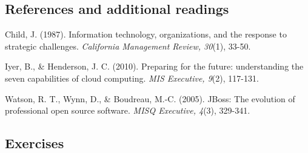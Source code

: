 \documentclass[
]{article}
\begin{document}
\hypertarget{references-and-additional-readings-6}{%
\subsection*{References and additional readings}\label{references-and-additional-readings-6}}

Child, J. (1987). Information technology, organizations, and the
response to strategic challenges. \emph{California Management Review, 30}(1),
33-50.

Iyer, B., \& Henderson, J. C. (2010). Preparing for the future:
understanding the seven capabilities of cloud computing. \emph{MIS Executive,
9}(2), 117-131.

Watson, R. T., Wynn, D., \& Boudreau, M.-C. (2005). JBoss: The evolution
of professional open source software. \emph{MISQ Executive, 4}(3), 329-341.

\hypertarget{exercises-12}{%
\subsection*{Exercises}\label{exercises-12}}
\end{document}
